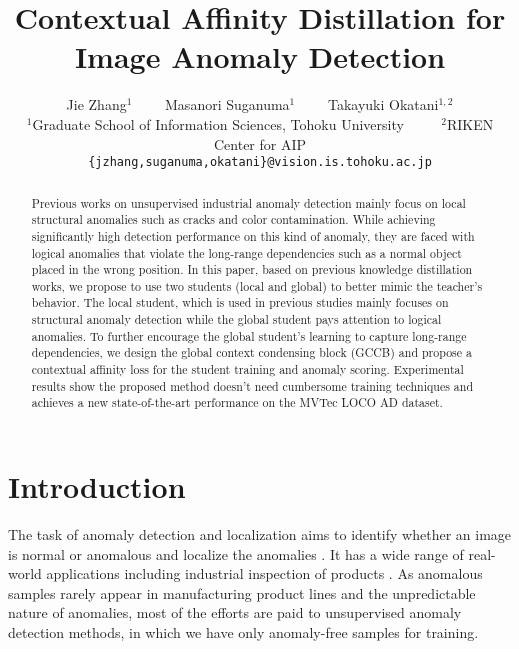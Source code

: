\documentclass[10pt,twocolumn,letterpaper]{article}
\begin{document}
\title{Contextual Affinity Distillation for Image Anomaly Detection}

\author{Jie Zhang$^1$
~~~~Masanori Suganuma$^1$
~~~~Takayuki Okatani$^{1,2}$\\
$^1$Graduate School of Information Sciences, Tohoku University ~~~~ $^2$RIKEN Center for AIP \\
{\tt\small \{jzhang,suganuma,okatani\}@vision.is.tohoku.ac.jp}
}

\maketitle
\ificcvfinal\thispagestyle{empty}\fi


\begin{abstract}
Previous works on unsupervised industrial anomaly detection mainly focus on local structural anomalies such as cracks and color contamination. While achieving significantly high detection performance on this kind of anomaly, they are faced with logical anomalies that violate the long-range dependencies such as a normal object placed in the wrong position. In this paper, based on previous knowledge distillation works, we propose to use two students (local and global) to better mimic the teacher's behavior. The local student, which is used in previous studies mainly focuses on structural anomaly detection while the global student pays attention to logical anomalies. To further encourage the global student's learning to capture long-range dependencies, we design the global context condensing block (GCCB) and propose a contextual affinity loss for the student training and anomaly scoring. Experimental results show the proposed method doesn't need cumbersome training techniques and achieves a new state-of-the-art performance on the MVTec LOCO AD dataset.
\end{abstract}

\section{Introduction}
\label{sec:intro}
The task of anomaly detection and localization aims to identify whether an image is normal or anomalous and localize the anomalies \cite{chalapathy2019deep,ruff2021unifying}. It has a wide range of real-world applications including industrial inspection of products \cite{bergmann2019mvtec,bergmann2018improving}. As anomalous samples rarely appear in manufacturing product lines and the unpredictable nature of anomalies, most of the efforts are paid to unsupervised anomaly detection methods, in which we have only anomaly-free samples for training.
\end{document}
